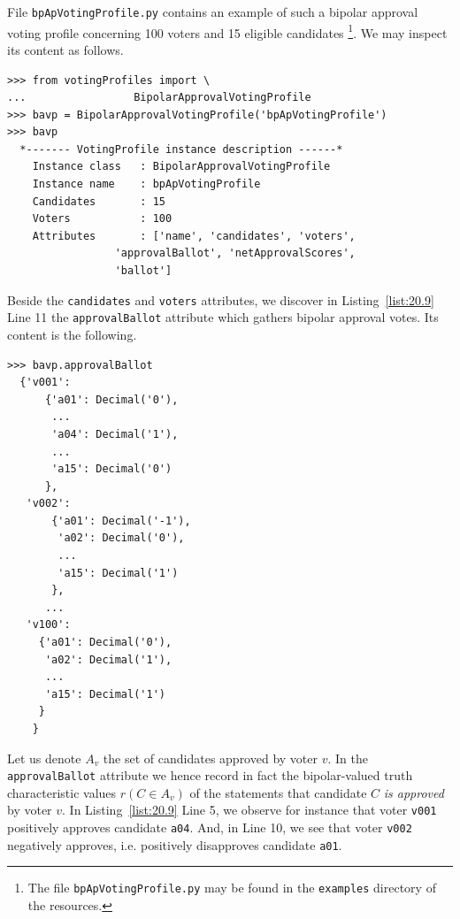 File \texttt{bpApVotingProfile.py} contains an example of such a bipolar approval voting profile concerning 100 voters and 15 eligible candidates \footnote{The file \texttt{bpApVotingProfile.py} may be found in the \texttt{examples} directory of the \Digraph resources.}. We may inspect its content as follows.
\begin{lstlisting}[caption={Bipolar approval vonting profiles},label=list:20.9]
>>> from votingProfiles import \
...                 BipolarApprovalVotingProfile
>>> bavp = BipolarApprovalVotingProfile('bpApVotingProfile')
>>> bavp
  *------- VotingProfile instance description ------*
    Instance class   : BipolarApprovalVotingProfile
    Instance name    : bpApVotingProfile
    Candidates       : 15
    Voters           : 100
    Attributes       : ['name', 'candidates', 'voters',
                 'approvalBallot', 'netApprovalScores',
                 'ballot']
\end{lstlisting}
Beside the \texttt{candidates} and \texttt{voters} attributes, we discover in Listing~\vref{list:20.9} Line 11 the \texttt{approvalBallot} attribute which gathers bipolar approval votes. Its content is the following.
\begin{lstlisting}[caption={Inspecting a bipolar approval ballot},label=list:20.9]
>>> bavp.approvalBallot
  {'v001':
      {'a01': Decimal('0'),
       ...
       'a04': Decimal('1'),
       ...
       'a15': Decimal('0')
      },
   'v002':
       {'a01': Decimal('-1'),
        'a02': Decimal('0'),
        ...
        'a15': Decimal('1')
       },
      ...
   'v100':
     {'a01': Decimal('0'),
      'a02': Decimal('1'),
      ...
      'a15': Decimal('1')
     }
    }
\end{lstlisting}	
Let us denote $A_v$ the set of candidates approved by voter $v$. In the \texttt{approvalBallot} attribute we hence record in fact the bipolar-valued truth characteristic values $r(C \in A_v)$ of the statements that candidate $C$ \emph{is approved} by voter $v$. In Listing~\vref{list:20.9} Line 5, we observe for instance that voter \texttt{v001} positively approves candidate \texttt{a04}. And, in Line 10, we see that voter \texttt{v002} negatively approves, i.e. positively disapproves candidate \texttt{a01}.

